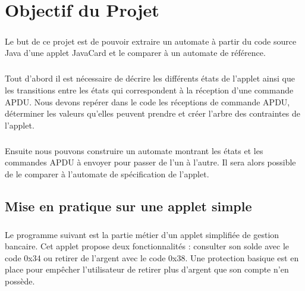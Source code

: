\chapter{Objectif du Projet}
\paragraph{}
Le but de ce projet est de pouvoir extraire un automate à partir du code source Java d’une applet JavaCard et le comparer à un automate de référence.

\paragraph{}
Tout d’abord il est nécessaire de décrire les différents états de l’applet ainsi que les transitions entre les états qui correspondent à la réception d’une commande APDU. Nous devons repérer dans le code les réceptions de commande APDU, déterminer les valeurs qu’elles peuvent prendre et créer l’arbre des contraintes de l’applet.
\paragraph{}
Ensuite nous pouvons construire un automate montrant les états et les commandes APDU à envoyer pour passer de l’un à l’autre. Il sera alors possible de le comparer à l’automate de spécification de l’applet.

\section{Mise en pratique sur une applet simple}

\paragraph{}
Le programme suivant est la partie métier d’un applet simplifiée de gestion bancaire. Cet applet propose deux fonctionnalités : consulter son solde avec le code 0x34 ou retirer de l’argent avec le code 0x38. Une protection basique est en place pour empêcher l’utilisateur de retirer plus d’argent que son compte n’en possède.


